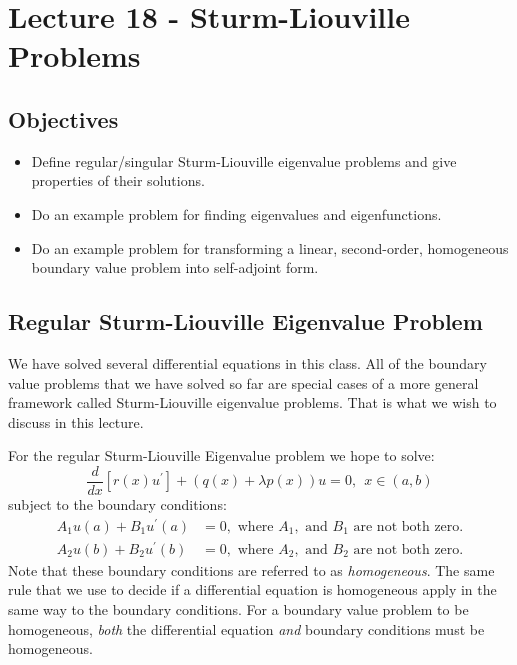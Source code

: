 \chapter{Lecture 18 - Sturm-Liouville Problems}
\label{ch:lec18}
\section{Objectives}
\begin{itemize}
\item Define regular/singular Sturm-Liouville eigenvalue problems and give properties of their solutions.
\item Do an example problem for finding eigenvalues and eigenfunctions.
\item Do an example problem for transforming a linear, second-order, homogeneous boundary value problem into self-adjoint form.
\end{itemize}

\section{Regular Sturm-Liouville Eigenvalue Problem} 
We have solved several differential equations in this class.  All of the boundary value problems that we have solved so far are special cases of a more general framework called Sturm-Liouville eigenvalue problems. That is what we wish to discuss in this lecture.

For the regular Sturm-Liouville Eigenvalue problem we hope to solve:
\begin{equation}
\frac{d}{dx}\left[r(x)u^{\prime}\right] + \left(q(x) + \lambda p(x)\right)u = 0,  \ \ x\in(a,b)
\label{eq:sturm-liouville-evp}
\end{equation}
subject to the boundary conditions:
\begin{align*}
A_1u(a) + B_1u^{\prime}(a) &= 0, \text{ where }A_1,\text{ and }B_1\text{ are not both zero.} \\
A_2u(b) + B_2u^{\prime}(b) &= 0, \text{ where }A_2,\text{ and }B_2\text{ are not both zero.}
\end{align*}
Note that these boundary conditions are referred to as \emph{homogeneous}.  The same rule that we use to decide if a differential equation is homogeneous apply in the same way to the boundary conditions.  For a boundary value problem to be homogeneous, \emph{both} the differential equation \emph{and} boundary conditions must be homogeneous.

